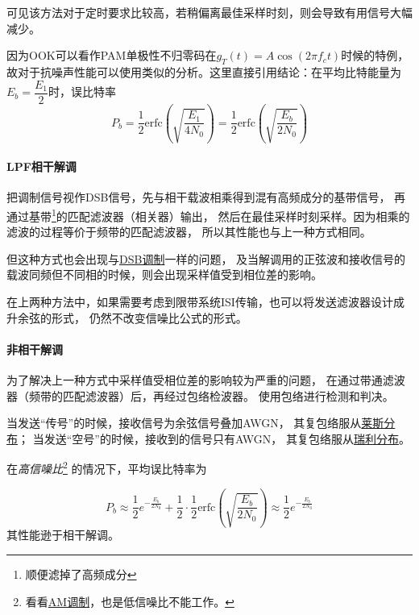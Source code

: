     可见该方法对于定时要求比较高，若稍偏离最佳采样时刻，则会导致有用信号大幅减少。

    因为OOK可以看作PAM单极性不归零码在$g_T(t)=A\cos(2\pi f_c t)$时候的特例，
    故对于抗噪声性能可以使用类似的分析。这里直接引用结论：在平均比特能量为$E_b=\dfrac{E_1}{2}$时，误比特率
    \begin{equation}
        P_b=\frac{1}{2}\text{erfc}\left(\sqrt{\frac{E_1}{4N_0}}\right)=\frac{1}{2}\text{erfc}\left(\sqrt{\frac{E_b}{2N_0}}\right)
    \end{equation}

    \paragraph{LPF相干解调}\mbox{}

    把调制信号视作DSB信号，先与相干载波相乘得到混有高频成分的基带信号，
    再通过基带\footnote{顺便滤掉了高频成分}的匹配滤波器（相关器）输出，
    然后在最佳采样时刻采样。因为相乘的滤波的过程等价于频带的匹配滤波器，
    所以其性能也与上一种方式相同。
    
    但这种方式也会出现与\hyperref[subsubsec:DSB-SCAM]{DSB调制}一样的问题，
    及当解调用的正弦波和接收信号的载波同频但不同相的时候，则会出现采样值受到相位差的影响。
    
    在上两种方法中，如果需要考虑到限带系统ISI传输，也可以将发送滤波器设计成升余弦的形式，
    仍然不改变信噪比公式的形式。

    \paragraph{非相干解调}\mbox{}
    
    为了解决上一种方式中采样值受相位差的影响较为严重的问题，
    在通过带通滤波器（频带的匹配滤波器）后，再经过包络检波器。
    使用包络进行检测和判决。

    当发送“传号”的时候，接收信号为余弦信号叠加AWGN，
    其复包络服从\hyperref[eq:Rician-distribution]{莱斯分布}；
    当发送“空号”的时候，接收到的信号只有AWGN，
    其复包络服从\hyperref[eq:Rayleigh]{瑞利分布}。

    在\emph{高信噪比}\footnote{看看\hyperref[subsubsec:AM]{AM调制}，也是低信噪比不能工作。}
    的情况下，平均误比特率为
    
    \vspace{-2ex}
    \begin{equation}
        P_b\approx\frac{1}{2}e^{-\frac{E_b}{2N_0}}+\frac{1}{2}\cdot\frac{1}{2}\text{erfc}\left(\sqrt{\frac{E_b}{2N_0}}\right)\approx\frac{1}{2}e^{-\frac{E_b}{2N_0}}
    \end{equation}
    \vspace{-2ex}
    其性能逊于相干解调。

